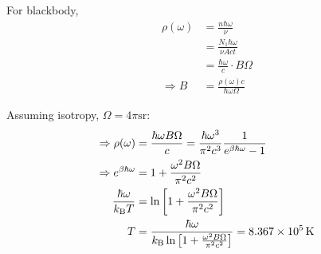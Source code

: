 \begin{parts}
	For blackbody,
	\begin{align*}
		\rho(\omega) &= \frac{n\hbar\omega}{\nu} \\
		&= \frac{N_1 \hbar\omega}{\nu Act} \\
		&= \frac{\hbar\omega}{c} \cdot B\Omega \\
		\Rightarrow B &= \frac{\rho(\omega) c}{\hbar\omega\Omega}
	\end{align*}
	
	Assuming isotropy, $\Omega = 4\pi\si{\steradian}$:
	\begin{align*}
		\Rightarrow \rho(\omega) &= \frac{\hbar\omega B\Omega}{c} = \frac{\hbar\omega^3}{\pi^2 c^3} \frac{1}{e^{\beta\hbar\omega} - 1} \\
		\Rightarrow e^{\beta\hbar\omega} &= 1 + \frac{\omega^2 B\Omega}{\pi^2 c^2} \\
		\frac{\hbar\omega}{k_\mathrm{B} T} &= \ln\left[1 + \frac{\omega^2 B\Omega}{\pi^2 c^2}\right] \\
		T &= \frac{\hbar\omega}{k_\mathrm{B} \ln\left[1 + \frac{\omega^2 B\Omega}{\pi^2 c^2}\right]} = \SI{8.367e5}{\kelvin}
	\end{align*}
\end{parts}